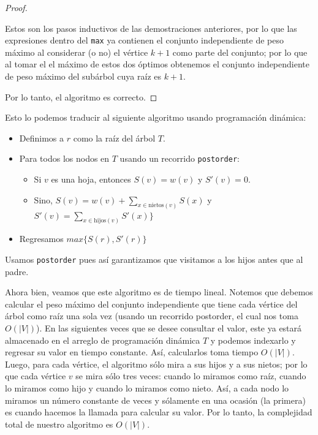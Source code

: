 \documentclass[letterpaper,11pt]{article}
\begin{document}
\begin{enumerate}
\begin{proof}
\begin{itemize}
            Estos son los pasos inductivos de las demostraciones anteriores, 
            por lo que las expresiones dentro del \texttt{max} ya contienen 
            el conjunto independiente de peso máximo al considerar (o no) el 
            vértice $k+1$ como parte del conjunto; por lo que al tomar el 
            el máximo de estos dos óptimos obtenemos el conjunto independiente
            de peso máximo del subárbol cuya raíz es $k+1$.
        \end{itemize}

        Por lo tanto, el algoritmo es correcto.

    \end{proof}

    Esto lo podemos traducir al siguiente algoritmo usando programación dinámica:
    \begin{itemize}
        \item Definimos a $r$ como la raíz del árbol $T$.

        \item Para todos los nodos en $T$ usando un recorrido \texttt{postorder}:
        \begin{itemize}
            \item Si $v$ es una hoja, entonces $S(v) = w(v)$ y $S'(v) = 0$.
            
            \item Sino, $S(v) = w(v) + \sum_{x \in \text{nietos}(v)} S(x)$ y 
            $S'(v) = \sum_{x \in \text{hijos}(v)} S'(x)\}$
        \end{itemize}

        \item Regresamos $max\{S(r), S'(r)\}$
    \end{itemize}

    Usamos \texttt{postorder} pues así garantizamos que visitamos a los hijos 
    antes que al padre. 

    Ahora bien, veamos que este algoritmo es de tiempo lineal. Notemos que 
    debemos calcular el peso máximo del conjunto independiente que tiene cada 
    vértice del árbol como raíz una sola vez (usando un recorrido postorder, 
    el cual nos toma $O(|V|)$). En las siguientes veces que se desee consultar 
    el valor, este ya estará almacenado en el arreglo de programación dinámica 
    $T$ y podemos indexarlo y regresar su valor en tiempo constante. Así, 
    calcularlos toma tiempo $O(|V|)$. Luego, para cada vértice, el algoritmo 
    sólo mira a sus hijos y a sus nietos; por lo que cada vértice $v$ se mira 
    sólo tres veces: cuando lo miramos como raíz, cuando lo miramos como hijo y 
    cuando lo miramos como nieto. Así, a cada nodo lo miramos un número 
    constante de veces y sólamente en una ocasión (la primera) es cuando 
    hacemos la llamada para calcular su valor. Por lo tanto, la complejidad 
    total de nuestro algoritmo es $O(|V|)$. 


\end{enumerate}
\end{document}
